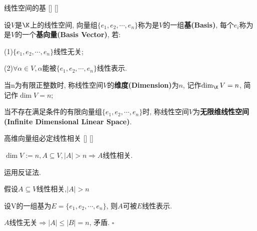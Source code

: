 \documentclass[UTF8]{ctexart}
\begin{document}
		\begin{dfn}
			[]
			{线性空间的基}
			[]
			[]

			设$V$是$\K$上的线性空间, 向量组$\{e_{1},e_{2},\cdots,e_{n}\}$称为是$V$的一组\textbf{基(Basis)}, 每个$e_{i}$称为是$V$的一个\textbf{基向量(Basis Vector)}, 若:
			 
			(1)$\{e_{1},e_{2},\cdots,e_{n}\}$线性无关; 
			
			(2)$\forall \alpha\in V,\alpha$能被$\{e_{1},e_{2},\cdots,e_{n}\}$线性表示. 
			
			当n为有限正整数时, 称线性空间$V$的\textbf{维度(Dimension)}为$n$, 记作$\dim_{\K}V=n$, 简记作$\dim V=n$; 
			
			当不存在满足条件的有限向量组$\{e_{1},e_{2},\cdots,e_{n}\}$时, 称线性空间$V$为\textbf{无限维线性空间(Infinite Dimensional Linear Space)}. 

		\end{dfn}
		
		\begin{ppt}
			[]
			{高维向量组必定线性相关}
			[]
			[]

			$\dim V:=n, A\subseteq V, |A|>n\Longrightarrow A$线性相关. 
		\end{ppt}
  
		\begin{prf}
			
			运用反证法. 
			
			假设$A\subseteq V$线性相关,$|A|>n$ 
			
			设V的一组基为$E=\{e_{1},e_{2},\cdots,e_{n}\}$, 则$A$可被$E$线性表示. 
			
			$A$线性无关$\Longrightarrow |A|\leq |B|=n$, 矛盾. $\square$
		\end{prf}
  
\end{document}

